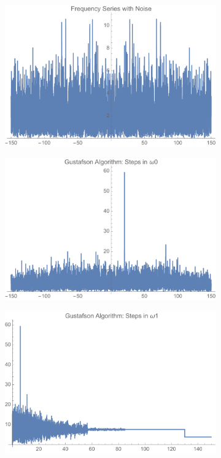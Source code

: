 \documentclass[onecolumn, groupedaddress, 10pt]{revtex4-1}
\begin{document}
\begin{figure}[t]
\begin{subfigure}{.5\textwidth}
  		\caption{}
	\end{subfigure}%
	\begin{subfigure}{.5\textwidth}
  		\centering
  		\includegraphics[width=.9\linewidth]{fourierSeriesNoise.pdf}
  		\caption{}
	\end{subfigure}
	\begin{subfigure}{.5\textwidth}
  		\centering
  		\includegraphics[width=.9\linewidth]{gustafsonAlgoStepInCarrier.pdf}
  		\caption{}
	\end{subfigure}%
	\begin{subfigure}{.5\textwidth}
  		\centering
  		\includegraphics[width=.9\linewidth]{gustafsonAlgoStepInModFreq.pdf}

\end{subfigure}
\end{figure}
\end{document}
